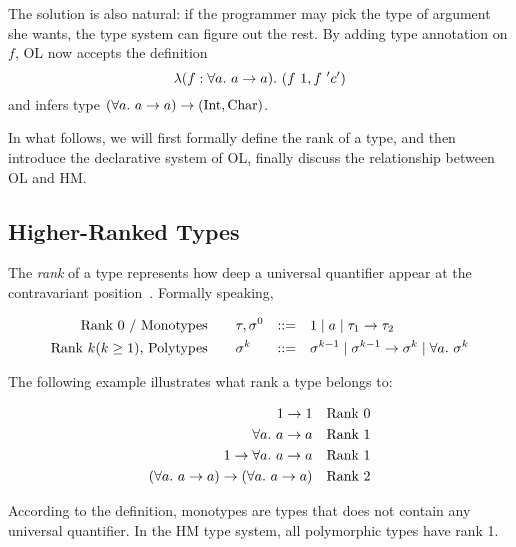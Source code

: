 The solution is also natural: if the programmer may pick the type of argument she wants,
the type system can figure out the rest. By adding type annotation on $f$,
OL now accepts the definition
$$\lam[(f:\all a \to a)] (f~1, f~'c')$$
and infers type $(\all a \to a) \to (\text{Int}, \text{Char})$.

In what follows, we will first formally define the rank of a type,
and then introduce the declarative system of OL,
finally discuss the relationship between OL and HM.

\subsection{Higher-Ranked Types}

The \emph{rank} of a type represents how deep a universal quantifier
appear at the contravariant position~\citep{rank1992kfoury}. Formally speaking,

\begin{gather*}
    \begin{aligned}
        \text{Rank 0 / Monotypes}\qquad& \tau, \sigma^0 &::=&\quad 1 \mid a \mid \tau_1\to \tau_2\\
        \text{Rank $k (k \ge 1)$, Polytypes}\qquad& \sigma^k &::=&\quad
            \sigma^{k-1} \mid \sigma^{k-1} \to \sigma^k \mid \all \sigma^k\\
    \end{aligned}
\end{gather*}

The following example illustrates what rank a type belongs to:

\begin{gather*}
    \begin{aligned}
        1 \to 1 && \text{Rank 0}\\
        \all a \to a && \text{Rank 1}\\
        1 \to \all a \to a && \text{Rank 1}\\
        (\all a \to a) \to (\all a \to a) && \text{Rank 2}\\
    \end{aligned}
\end{gather*}

According to the definition, monotypes are types that does not contain any universal quantifier.
In the HM type system, all polymorphic types have rank 1.


